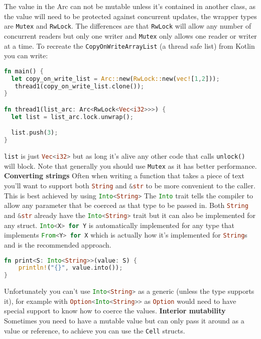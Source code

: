 \documentclass[a4paper,11pt]{article}
\begin{document}
The value in the Arc can not be mutable unless it's contained in another class, as the value will need to be protected against concurrent updates, the wrapper types are \lstinline[language=Rust]{Mutex} and \lstinline[language=Rust]{RwLock}. The differences are that \lstinline[language=Rust]{RwLock} will allow any number of concurrent readers but only one writer and \lstinline[language=Rust]{Mutex} only allows one reader or writer at a time. To recreate the \lstinline[language=Rust]{CopyOnWriteArrayList} (a thread safe list) from Kotlin you can write:
 \begin{lstlisting}[language=Rust,frame=single]
fn main() {
  let copy_on_write_list = Arc::new(RwLock::new(vec![1,2]));
   thread1(copy_on_write_list.clone());
}

fn thread1(list_arc: Arc<RwLock<Vec<i32>>>) {
  let list = list_arc.lock.unwrap();

  list.push(3);
}
\end{lstlisting}

\lstinline{list} is just \lstinline[language=Rust]{Vec<i32>} but as long it's alive any other code that calls \lstinline[language=Rust]{unlock()} will block.
\newline
Note that generally you should use \lstinline[language=Rust]{Mutex} as it has better performance.
\medskip
\medskip
\newline
\textbf{Converting strings}
\newline
Often when writing a function that takes a piece of text you'll want to support both \lstinline[language=Rust]{String} and \lstinline[language=Rust]{&str} to be more convenient to the caller. This is best achieved by using \lstinline[language=Rust]{Into<String>}
The \lstinline[language=Rust]{Into} trait tells the compiler to allow any parameter that be coerced as that type to be passed in. Both \lstinline[language=Rust]{String} and \lstinline[language=Rust]{&str} already have the \lstinline[language=Rust]{Into<String>} trait but it can also be implemented for any struct. \lstinline[language=Rust]{Into<X> for Y} is automatically implemented for any type that implements \lstinline[language=Rust]{From<Y> for X} which is actually how it's implemented for \lstinline[language=Rust]{String}s and is the recommended approach.
\begin{lstlisting}[language=Rust,frame=single]
fn print<S: Into<String>>(value: S) {
    println!("{}", value.into());
}
\end{lstlisting}
Unfortunately you can't use \lstinline[language=Rust]{Into<String>} as a generic (unless the type supports it), for example with \lstinline[language=Rust]{Option<Into<String>>} as \lstinline[language=Rust]{Option} would need to have special support to know how to coerce the values.
\medskip
\medskip
\newline
\textbf{Interior mutability}
\newline
Sometimes you need to have a mutable value but can only pass it around as a value or reference, to achieve you can use the \lstinline[language=Rust]{Cell} structs.
\end{document}
